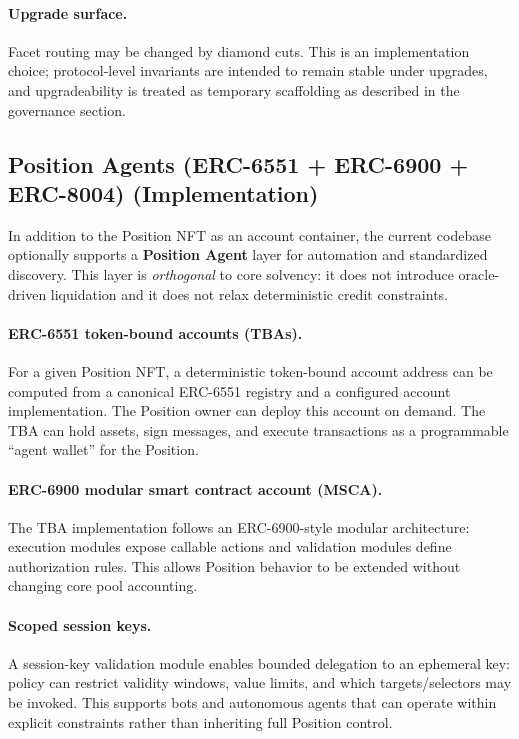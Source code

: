 \documentclass[version=preprint]{iacrcc}
\begin{document}
\paragraph{Upgrade surface.}
Facet routing may be changed by diamond cuts. This is an implementation choice; protocol-level invariants are intended to remain stable under upgrades, and upgradeability is treated as temporary scaffolding as described in the governance section.

\subsection{Position Agents (ERC-6551 + ERC-6900 + ERC-8004) (Implementation)}

In addition to the Position NFT as an account container, the current codebase optionally supports a \textbf{Position Agent} layer for automation and standardized discovery. This layer is \emph{orthogonal} to core solvency: it does not introduce oracle-driven liquidation and it does not relax deterministic credit constraints.

\paragraph{ERC-6551 token-bound accounts (TBAs).}
For a given Position NFT, a deterministic token-bound account address can be computed from a canonical ERC-6551 registry and a configured account implementation. The Position owner can deploy this account on demand. The TBA can hold assets, sign messages, and execute transactions as a programmable ``agent wallet'' for the Position.

\paragraph{ERC-6900 modular smart contract account (MSCA).}
The TBA implementation follows an ERC-6900-style modular architecture: execution modules expose callable actions and validation modules define authorization rules. This allows Position behavior to be extended without changing core pool accounting.

\paragraph{Scoped session keys.}
A session-key validation module enables bounded delegation to an ephemeral key: policy can restrict validity windows, value limits, and which targets/selectors may be invoked. This supports bots and autonomous agents that can operate within explicit constraints rather than inheriting full Position control.
\end{document}
